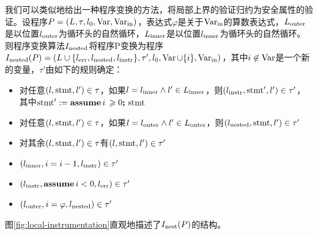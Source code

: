 我们可以类似地给出一种程序变换的方法，将局部上界的验证归约为安全属性的验证。设程序$P
= (L, \tau, l_0, \operatorname{Var},
\operatorname{Var}_{\operatorname{in}})$，表达式$\varphi$是关于$\operatorname{Var}_{\operatorname{in}}$的算数表达式，$L_{\operatorname{outer}}$是以位置$l_{\operatorname{outer}}$为循环头的自然循环，$L_{\operatorname{inner}}$是以位置$l_{\operatorname{inner}}$为循环头的自然循环。则程序变换算法$I_{\operatorname{nested}}$将程序P变换为程序$I_{\operatorname{nested}}
(P) = (L \cup \{ l_{\operatorname{err}}, l_{\operatorname{nested}}, l_{\operatorname{instr}} \},
\tau', l_0, \operatorname{Var} \cup \{ i \}, \operatorname{Var}_{\operatorname{in}})$，其中$i \not\in
\operatorname{Var}$是一个新的变量，$\tau'$由如下的规则确定：
\begin{itemize}
  \item 对任意$(l, \operatorname{stmt}, l') \in \tau$，如果$l = l_{\operatorname{inner}}
  \wedge l' \in L_{\operatorname{inner}}$，则$(l_{\operatorname{instr}}, \operatorname{stmt}', l')
  \in \tau'$，其中$\operatorname{stmt}' := \textbf{assume} \, i \,
  \geqslant 0 \textbf{;} \, \operatorname{stmt}$
  
  \item 对任意$(l, \operatorname{stmt}, l') \in \tau$，如果$l = l_{\operatorname{outer}}
  \wedge l' \in L_{\operatorname{outer}}$，则$(l_{\operatorname{nested}}, \operatorname{stmt},
  l_{}') \in \tau'$
  
  \item 对其余$(l, \operatorname{stmt}, l') \in \tau$有$(l, \operatorname{stmt}, l') \in
  \tau'$
  
  \item $(l_{\operatorname{inner}}, i = i - 1, l_{\operatorname{instr}}) \in \tau'$
  
  \item $(l_{\operatorname{instr}}, \textbf{assume} \, i < 0, l_{\operatorname{err}})
  \in \tau'$
  
  \item $(l_{\operatorname{outer}}, i = \varphi, l_{\operatorname{nested}}) \in \tau'$
\end{itemize}


图\ref{fig:local-instrumentation}直观地描述了$I_{\operatorname{nest}} (P)$的结构。

